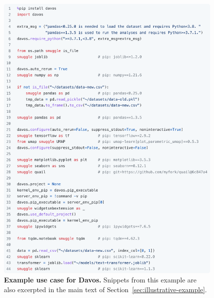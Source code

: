 \documentclass[preprint,12pt,a4paper]{elsarticle}
\begin{document}
\begin{figure}[tp]
\centering
\includegraphics[width=\textwidth]{figs/illustrative_example}
\caption{\small \textbf{Example use case for Davos.}
  Snippets from this example are also excerpted in the main text of
  Section~\ref{sec:illustrative-example}.}
\label{fig:illustrative-example}
\end{figure}
\end{document}
